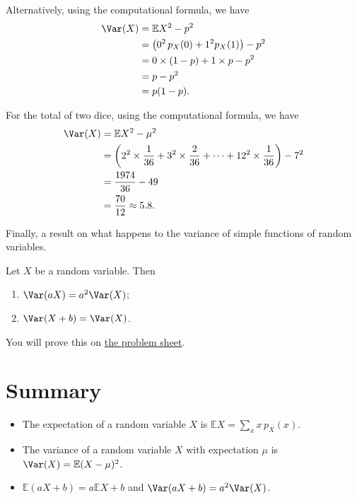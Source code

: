 \documentclass[
  letterpaper,
  DIV=11,
  numbers=noendperiod]{scrreprt}
\providecommand{\tightlist}{%
  \setlength{\itemsep}{0pt}\setlength{\parskip}{0pt}}\usepackage{longtable,booktabs,array}
\theoremstyle{remark}
\begin{document}
Alternatively, using the computational formula, we have \begin{align*}
\Var(X) &= \mathbb EX^2 - p^2 \\
        &= \big(0^2\,p_X(0) + 1^2 p_X(1)\big) - p^2 \\
        &= 0\times(1-p) + 1\times p - p^2 \\
        &= p - p^2 \\
        &= p(1-p) .
\end{align*}

For the total of two dice, using the computational formula, we have
\begin{align*}
\Var(X) &= \mathbb EX^2 - \mu^2 \\
        &= \left(2^2 \times \frac{1}{36} + 3^2 \times \frac{2}{36} + \cdots + 12^2 \times \frac{1}{36}\right) - 7^2 \\
        &= \frac{1974}{36} - 49 \\
        &= \frac{70}{12} \approx 5.8 .
\end{align*}

Finally, a result on what happens to the variance of simple functions of
random variables.

Let \(X\) be a random variable. Then

\begin{enumerate}
\def\labelenumi{\arabic{enumi}.}
\tightlist
\item
  \(\Var(aX) = a^2\Var (X)\);
\item
  \(\Var(X + b) = \Var(X)\).
\end{enumerate}

You will prove this on \protect\hyperlink{P3}{the problem sheet}.

\hypertarget{summary-L10}{%
\section*{Summary}\label{summary-L10}}


\begin{itemize}
\tightlist
\item
  The expectation of a random variable \(X\) is
  \(\mathbb EX = \sum_x x\, p_X(x)\).
\item
  The variance of a random variable \(X\) with expectation \(\mu\) is
  \(\Var(X) = \mathbb E(X - \mu)^2\).
\item
  \(\mathbb E(aX+b) = a\mathbb EX + b\) and \(\Var(aX+b) = a^2\Var(X)\).
\end{itemize}
\end{document}
